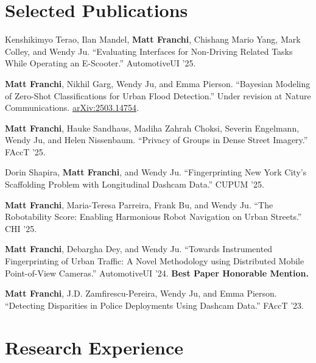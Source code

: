 \documentclass[10pt,letterpaper]{report}
\begin{document}
    \section*{Selected Publications}

    \begin{tablist}

        \item[2025] \tab{}Kenshikimyo Terao, Ilan Mandel, \textbf{Matt Franchi}, Chishang Mario Yang, Mark Colley, and Wendy Ju. ``Evaluating Interfaces for Non-Driving Related Tasks While Operating an E-Scooter.'' AutomotiveUI '25.

        \item[2025] \tab{}\textbf{Matt Franchi}, Nikhil Garg, Wendy Ju, and Emma Pierson. ``Bayesian Modeling of Zero-Shot Classifications for Urban Flood Detection.'' Under revision at Nature Communications. \href{https://arxiv.org/abs/2503.14754}{arXiv:2503.14754}.

        \item[2025] \tab{}\textbf{Matt Franchi}, Hauke Sandhaus, Madiha Zahrah Choksi, Severin Engelmann, Wendy Ju, and Helen Nissenbaum. ``Privacy of Groups in Dense Street Imagery.'' FAccT '25.

        \item[2025] \tab{}Dorin Shapira, \textbf{Matt Franchi}, and Wendy Ju. ``Fingerprinting New York City's Scaffolding Problem with Longitudinal Dashcam Data.'' CUPUM '25.

        \item[2025] \tab{}\textbf{Matt Franchi}, Maria-Teresa Parreira, Frank Bu, and Wendy Ju. ``The Robotability Score: Enabling Harmonious Robot Navigation on Urban Streets.'' CHI '25.

        \item[2024] \tab{}\textbf{Matt Franchi}, Debargha Dey, and Wendy Ju. ``Towards Instrumented Fingerprinting of Urban Traffic: A Novel Methodology using Distributed Mobile Point-of-View Cameras.'' AutomotiveUI '24. \textbf{Best Paper Honorable Mention.}

        \item[2023] \tab{}\textbf{Matt Franchi}, J.D. Zamfirescu-Pereira, Wendy Ju, and Emma Pierson. ``Detecting Disparities in Police Deployments Using Dashcam Data.'' FAccT '23.

    \end{tablist}

    \section*{Research Experience}
\end{document}
